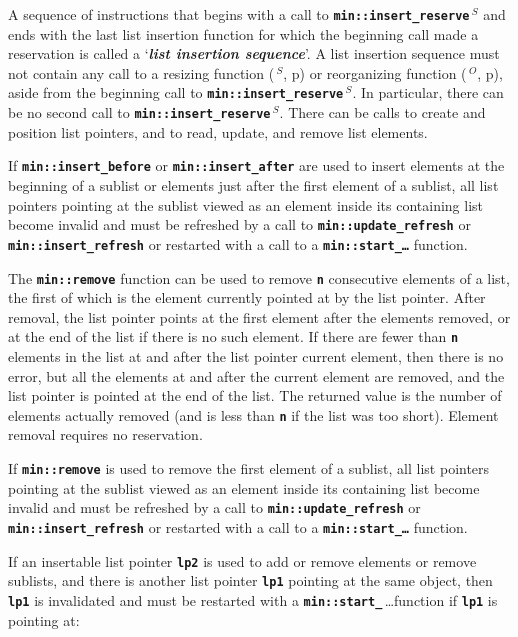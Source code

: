 \documentclass[12pt]{article}
\newcommand{\TT}[1]{{\tt \bfseries #1}}
\newcommand{\key}[1]{{\bf \em #1}\index{#1}}
\newcommand{\pagref}[1]{p\pageref{#1}}
\newcommand{\EOL}{\penalty \exhyphenpenalty}
\newcommand{\RESIZE}{$\,^S$}
\newcommand{\REORG}{$\,^O$}
\begin{document}
A sequence of instructions that begins with a
call to \TT{min::\EOL insert\_reserve\RESIZE} and ends with the last
list insertion function for which the beginning call made a reservation
is called a `\key{list insertion sequence}'.  A list insertion sequence
must not contain any call to a resizing function
(\RESIZE, \pagref{RESIZING-FUNCTIONS}) or reorganizing function
(\REORG, \pagref{REORGANIZING-FUNCTIONS}), aside from
the beginning call to \TT{min::\EOL insert\_reserve\RESIZE}.
In particular, there can be no
second call to \TT{min::\EOL insert\_reserve\RESIZE}.  There can be calls to
create and position list pointers, and to read, update, and remove
list elements.

If \TT{min::\EOL insert\_\EOL before}
or \TT{min::\EOL insert\_\EOL after}
are used to insert elements at the beginning of a sublist or elements
just after the first element of a sublist,
all list pointers pointing at the sublist viewed as an element
inside its containing list
become invalid and must be refreshed by
a call to \TT{min::\EOL update\_\EOL refresh} or
\TT{min::\EOL insert\_\EOL refresh} or restarted with a call to a
\TT{min::\EOL start\_\ldots} function.

The \TT{min::\EOL remove} function can be used to remove
\TT{n} consecutive elements
of a list, the first of which is the element currently pointed at by
the list pointer.
After removal, the list pointer points at the first element after the
elements removed, or at the end of the list if there is no such element.
If there are fewer than \TT{n} elements in the list at and after
the list pointer current element, then there is no error, but all the
elements at and after the current element are removed, and the list
pointer is pointed at the end of the list.  The returned value is the
number of elements actually removed (and is less than \TT{n} if the
list was too short).  Element removal requires no reservation.

If \TT{min::\EOL remove} is used to remove the first element of
a sublist,
all list pointers pointing at the sublist viewed as an element
inside its containing list
become invalid and must be refreshed by
a call to \TT{min::\EOL update\_\EOL refresh} or
\TT{min::\EOL insert\_\EOL refresh} or restarted with a call to a
\TT{min::\EOL start\_\ldots} function.

If an insertable list pointer \TT{lp2} is used to add or remove
elements or remove sublists, and there is another list pointer \TT{lp1}
pointing at the same object, then \TT{lp1} is invalidated and must
be restarted with a
\TT{min::\EOL start\_}\,\ldots function\label{RESTARTING_LIST_PTR}
if \TT{lp1} is pointing at:
\end{document}
